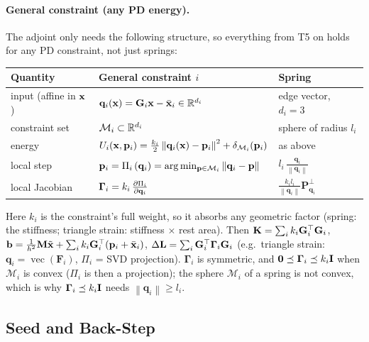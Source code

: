 \paragraph{General constraint (any PD energy).} The adjoint only needs the following structure, so everything from T5 on holds for any PD constraint, not just springs:
\begin{center}
\renewcommand{\arraystretch}{1.5}
\begin{tabular}{lll}
\textbf{Quantity} & \textbf{General constraint} $i$ & \textbf{Spring} \\ \hline
input (affine in $\mathbf{x}$)  & $\mathbf{q}_i(\mathbf{x}) = \mathbf{G}_i\mathbf{x} - \bar{\mathbf{x}}_i \in \mathbb{R}^{d_i}$ & edge vector, $d_i = 3$ \\
constraint set          & $\mathcal{M}_i \subset \mathbb{R}^{d_i}$ & sphere of radius $l_i$ \\
energy                  & $U_i(\mathbf{x},\mathbf{p}_i) = \tfrac{k_i}{2}\left\|\mathbf{q}_i(\mathbf{x}) - \mathbf{p}_i\right\|^2 + \delta_{\mathcal{M}_i}(\mathbf{p}_i)$ & as above \\
local step              & $\mathbf{p}_i = \Pi_i\left(\mathbf{q}_i\right) = \arg\min_{\mathbf{p}\in\mathcal{M}_i}\left\|\mathbf{q}_i - \mathbf{p}\right\|$ & $l_i\,\tfrac{\mathbf{q}_i}{\left\|\mathbf{q}_i\right\|}$ \\
local Jacobian          & $\boldsymbol{\Gamma}_i = k_i\,\frac{\partial \Pi_i}{\partial \mathbf{q}_i}$ & $\tfrac{k_il_i}{\left\|\mathbf{q}_i\right\|}\mathbf{P}_{\mathbf{q}_i}^\perp$ \\
\end{tabular}
\end{center}
\noindent Here $k_i$ is the constraint's full weight, so it absorbs any geometric factor (spring: the stiffness; triangle strain: stiffness $\times$ rest area). Then $\mathbf{K} = \sum_i k_i\mathbf{G}_i^\top\mathbf{G}_i$, \quad $\mathbf{b} = \tfrac{1}{h^2}\mathbf{M}\tilde{\mathbf{x}} + \sum_i k_i\mathbf{G}_i^\top(\mathbf{p}_i + \bar{\mathbf{x}}_i)$, \quad $\Delta\mathbf{L} = \sum_i\mathbf{G}_i^\top\boldsymbol{\Gamma}_i\mathbf{G}_i$ (e.g.\ triangle strain: $\mathbf{q}_i = \operatorname{vec}(\mathbf{F}_i)$, $\Pi_i$ = SVD projection). $\boldsymbol{\Gamma}_i$ is symmetric, and $\mathbf{0} \preceq \boldsymbol{\Gamma}_i \preceq k_i\mathbf{I}$ when $\mathcal{M}_i$ is convex ($\Pi_i$ is then a projection); the sphere $\mathcal{M}_i$ of a spring is not convex, which is why $\boldsymbol{\Gamma}_i \preceq k_i\mathbf{I}$ needs $\left\|\mathbf{q}_i\right\| \ge l_i$.

\subsection{Seed and Back-Step}
\label{sec:npd_seed}

